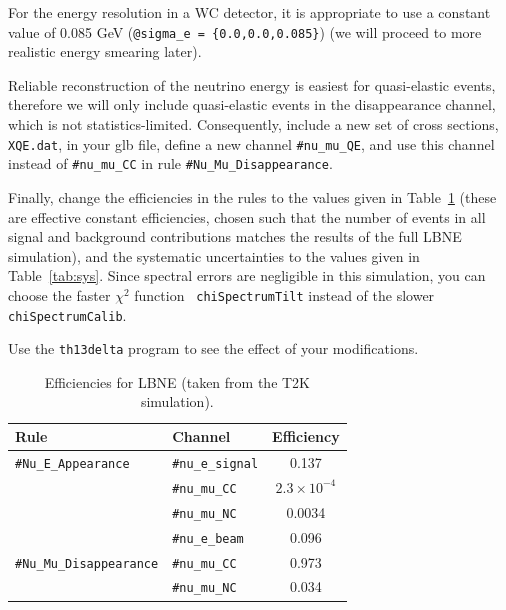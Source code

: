 \documentclass[12pt,a4paper]{article}
\theoremstyle{dotless}
\begin{document}
For the energy resolution in a WC detector, it is appropriate to use a constant
value of 0.085 GeV ({\tt @sigma\_e = \{0.0,0.0,0.085\}}) (we will proceed to
more realistic energy smearing later).

Reliable reconstruction of the neutrino energy is easiest for quasi-elastic
events, therefore we will only include quasi-elastic events in the
disappearance channel, which is not statistics-limited. Consequently, include a
new set of cross sections, {\tt XQE.dat}, in your glb file, define a new
channel {\tt \#nu\_mu\_QE}, and use this channel instead of {\tt \#nu\_mu\_CC}
in rule {\tt \#Nu\_Mu\_Disappearance}.

Finally, change the efficiencies in the rules to the values given in
Table~\ref{tab:eff} (these are effective constant efficiencies, chosen such
that the number of events in all signal and background contributions matches
the results of the full LBNE simulation), and the systematic uncertainties to
the values given in Table~\ref{tab:sys}.  Since spectral errors are negligible
in this simulation, you can choose the faster $\chi^2$ function {\tt
chiSpectrumTilt} instead of the slower {\tt chiSpectrumCalib}.

Use the {\tt th13delta} program to see the effect of your modifications.

\begin{table}
  \centering
  \begin{tabular}{llc}
    \hline
    Rule                               & Channel                    & Efficiency \\
    \hline
    {\tt \#Nu\_E\_Appearance}          & {\tt \#nu\_e\_signal}      & 0.137      \\
                                       & {\tt \#nu\_mu\_CC}         & $2.3 \times 10^{-4}$ \\
                                       & {\tt \#nu\_mu\_NC}         & 0.0034     \\
                                       & {\tt \#nu\_e\_beam}        & 0.096      \\\hline
    {\tt \#Nu\_Mu\_Disappearance}      & {\tt \#nu\_mu\_CC}         & 0.973      \\
                                       & {\tt \#nu\_mu\_NC}         & 0.034      \\\hline
    \hline
  \end{tabular}
  \caption{Efficiencies for LBNE (taken from the T2K simulation).}
  \label{tab:eff}
\end{table}
\end{document}
